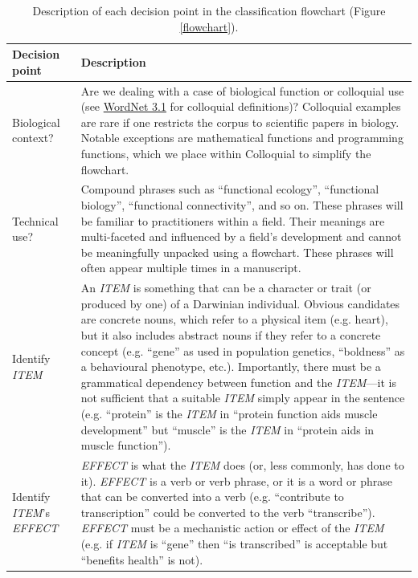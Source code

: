 \documentclass{article}
\begin{document}
\begin{landscape}
  \begin{table}
    \small
    \caption{Description of each decision point in the classification flowchart (Figure \ref{flowchart}).}
  \begin{tabular}{|p{0.17\linewidth}|p{0.97\linewidth}|}
    \hline
    Decision point & Description \\
    \hline
    Biological context? & Are we dealing with a case of biological function or colloquial use (see \href{http://wordnetweb.princeton.edu/perl/webwn?s=function&sub=Search+WordNet&o2=&o0=1&o8=1&o1=1&o7=&o5=&o9=&o6=&o3=&o4=&h=}{WordNet 3.1} for colloquial definitions)? Colloquial examples are rare if one restricts the corpus to scientific papers in biology. Notable exceptions are mathematical functions and programming functions, which we place within Colloquial to simplify the flowchart. \\
    \hline
    Technical use? & Compound phrases such as ``functional ecology'', ``functional biology'', ``functional connectivity'', and so on. These phrases will be familiar to practitioners within a field. Their meanings are multi-faceted and influenced by a field's development and cannot be meaningfully unpacked using a flowchart.  These phrases will often appear multiple times in a manuscript. \\
    \hline
    Identify \emph{ITEM} &  An \emph{ITEM} is something that can be a character or trait (or produced by one) of a Darwinian individual. Obvious candidates are concrete nouns, which refer to a physical item (e.g. heart), but it also includes abstract nouns if they refer to a concrete concept (e.g. ``gene'' as used in population genetics, ``boldness'' as a behavioural phenotype, etc.). Importantly, there must be a grammatical dependency between function and the \emph{ITEM}---it is not sufficient that a suitable \emph{ITEM} simply appear in the sentence (e.g. ``protein'' is the \emph{ITEM} in  ``protein function aids muscle development'' but ``muscle'' is the \emph{ITEM} in ``protein aids in muscle function''). \\
    \hline
    Identify \emph{ITEM}'s \emph{EFFECT} & \emph{EFFECT} is what the \emph{ITEM} does (or, less commonly, has done to it). \emph{EFFECT} is a verb or verb phrase, or it is a word or phrase that can be converted into a verb (e.g. ``contribute to transcription'' could be converted to the verb ``transcribe''). \emph{EFFECT} must be a mechanistic action or effect of the \emph{ITEM} (e.g. if \emph{ITEM} is ``gene'' then ``is transcribed'' is acceptable but ``benefits health'' is not). \\

\end{tabular}
\end{table}
\end{landscape}
\end{document}
